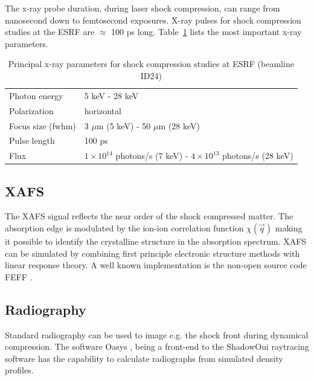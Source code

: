 \documentclass[10pt]{scrartcl}
\begin{document}
The x-ray probe duration, during laser shock compression, can range from nanosecond down to femtosecond exposures.
X-ray pulses for shock compression studies at the ESRF are $\approx$ 100 ps long. Table~\ref{tab:esrf_parameters} lists the most important x-ray parameters.

\begin{table}
  \centering
  \begin{tabular}{l|l}
    \hline
    \hline
    Photon energy & 5 keV - 28 keV \\
    Polarization & horizontal \\
    Focus size (fwhm) & 3 $\mu$m (5 keV) - 50 $\mu$m (28 keV)\\
    Pulse length & 100 ps\\
    Flux  & $1\times 10^{14}$ photons/s (7 keV) - $4\times 10^{13}$ photons/s (28 keV) \\
    \hline
    \hline
  \end{tabular}
  \caption{Principal x-ray parameters for shock compression studies at ESRF
  (beamline ID24)}
  \label{tab:esrf_parameters}
\end{table}

\subsection{XAFS}
The XAFS signal reflects the near order of the shock compressed matter. The absorption edge is modulated by the ion-ion correlation function
$\chi(\vec q)$ making it possible to identify the crystalline
structure in the absorption spectrum. XAFS can be simulated by combining first
principle electronic structure methods with linear response theory. A well known
implementation is the non-open source code FEFF \cite{Rehr2009}.

\subsection{Radiography}
Standard radiography can be used to image e.g. the shock front during dynamical
compression. The software Oasys \cite{Rio2014}, being a front-end to the ShadowOui raytracing
software has the capability to calculate radiographs from simulated density
profiles.
\end{document}
